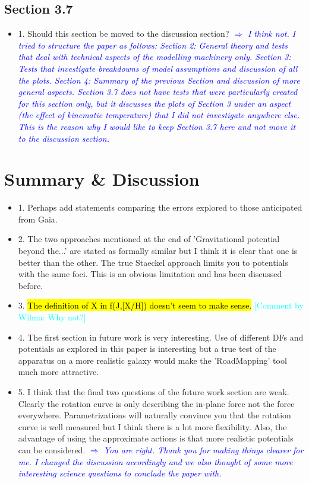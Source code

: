 \documentclass[10pt,a4paper]{article}
\newcommand{\HW}[1]{\textcolor{Cyan}{#1}}
\newcommand{\Comment}[1]{\textsl{\textcolor{Blue}{$\Longrightarrow$ {#1}}}}
\begin{document}
\subsection{Section 3.7}
\begin{itemize}
\item 1. Should this section be moved to the discussion section?
\Comment{I think not. I tried to structure the paper as follows: Section 2: General theory and tests that deal with technical aspects of the modelling machinery only. Section 3: Tests that investigate breakdowns of model assumptions and discussion of all the plots. Section 4: Summary of the previous Section and discussion of more general aspects. Section 3.7 does not have tests that were particularly created for this section only, but it discusses the plots of Section 3 under an aspect (the effect of kinematic temperature) that I did not investigate anywhere else. This is the reason why I would like to keep Section 3.7 here and not move it to the discussion section.}
\end{itemize}

\section{Summary \& Discussion}
\begin{itemize}
\item 1. Perhaps add statements comparing the errors explored to those anticipated from Gaia.
\item 2. The two approaches mentioned at the end of 'Gravitational potential beyond the...' are stated as formally similar but I think it is clear that one is better than the other. The true Staeckel approach limits you to potentials with the same foci. This is an obvious limitation and has been discussed before.
\item 3. \hl{The definition of X in f(J,[X/H]) doesn't seem to make sense.} \HW{[Comment by Wilma: Why not?]}
\item 4. The first section in future work is very interesting. Use of different DFs and potentials as explored in this paper is interesting but a true test of the apparatus on a more realistic galaxy would make the 'RoadMapping' tool much more attractive.
\item 5. I think that the final two questions of the future work section are weak. Clearly the rotation curve is only describing the in-plane force not the force everywhere. Parametrizations will naturally convince you that the rotation curve is well measured but I think there is a lot more flexibility. Also, the advantage of using the approximate actions is that more realistic potentials can be considered. \Comment{You are right. Thank you for making things clearer for me. I changed the discussion accordingly and we also thought of some more interesting science questions to conclude the paper with.}
\end{itemize}
\end{document}
